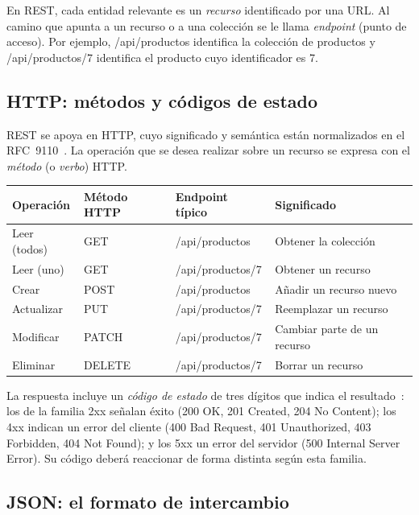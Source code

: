 \documentclass[11pt,a4paper]{article}
\newcommand{\code}[1]{{\ttfamily\color{ngdark}#1}}
\begin{document}
En REST, cada entidad relevante es un \emph{recurso} identificado por una URL. Al camino que apunta a un recurso o a una colección se le llama \emph{endpoint} (punto de acceso). Por ejemplo, \code{/api/productos} identifica la colección de productos y \code{/api/productos/7} identifica el producto cuyo identificador es 7.

\subsection{HTTP: métodos y códigos de estado}

REST se apoya en HTTP, cuyo significado y semántica están normalizados en el RFC~9110~\cite{rfc9110}. La operación que se desea realizar sobre un recurso se expresa con el \emph{método} (o \emph{verbo}) HTTP.

\begin{center}
\begin{tabular}{@{}llll@{}}
	\toprule
	\textbf{Operación} & \textbf{Método HTTP} & \textbf{Endpoint típico} & \textbf{Significado} \\
	\midrule
	Leer (todos)   & \code{GET}    & \code{/api/productos}    & Obtener la colección \\
	Leer (uno)     & \code{GET}    & \code{/api/productos/7}  & Obtener un recurso \\
	Crear          & \code{POST}   & \code{/api/productos}    & Añadir un recurso nuevo \\
	Actualizar     & \code{PUT}    & \code{/api/productos/7}  & Reemplazar un recurso \\
	Modificar      & \code{PATCH}  & \code{/api/productos/7}  & Cambiar parte de un recurso \\
	Eliminar       & \code{DELETE} & \code{/api/productos/7}  & Borrar un recurso \\
	\bottomrule
\end{tabular}
\end{center}

La respuesta incluye un \emph{código de estado} de tres dígitos que indica el resultado~\cite{rfc9110}: los de la familia \code{2xx} señalan éxito (\code{200 OK}, \code{201 Created}, \code{204 No Content}); los \code{4xx} indican un error del cliente (\code{400 Bad Request}, \code{401 Unauthorized}, \code{403 Forbidden}, \code{404 Not Found}); y los \code{5xx} un error del servidor (\code{500 Internal Server Error}). Su código deberá reaccionar de forma distinta según esta familia.

\subsection{JSON: el formato de intercambio}
\end{document}
